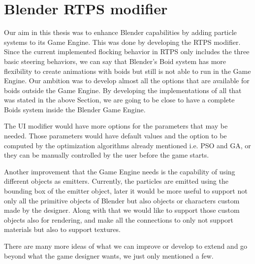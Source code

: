 \section{Blender RTPS modifier}
Our aim in this thesis was to enhance Blender capabilities by adding particle systems to its Game Engine. This was done by developing the RTPS modifier. Since the current implemented flocking behavior in RTPS only includes the three basic steering behaviors, we can say that Blender's Boid system has more flexibility to create animations with boids but still is not able to run in the Game Engine. Our ambition was to develop almost all the options that are available for boids outside the Game Engine. By developing the implementations of all that was stated in the above Section, we are going to be close to have a complete Boids system inside the Blender Game Engine.  

The UI modifier would have more options for the parameters that may be needed. Those parameters would have default values and the option to be computed by the optimization algorithms already mentioned i.e. PSO and GA, or they can be manually controlled by the user before the game starts.

Another improvement that the Game Engine needs is the capability of using different objects as emitters. Currently, the particles are emitted using the bounding box of the emitter object, later it would be more useful to support not only all the primitive objects of Blender but also objects or characters custom made by the designer. Along with that we would like to support those custom objects also for rendering, and make all the connections to only not support materials but also to support textures.

There are many more ideas of what we can improve or develop to extend and go beyond what the game designer wants, we just only mentioned a few.

